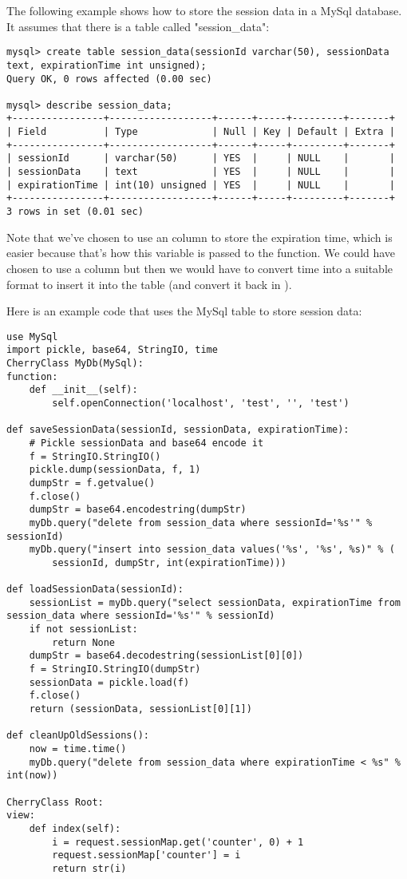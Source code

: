 \documentclass{manual}
\begin{document}
The following example shows how to store the session data in a MySql database. It assumes that there is a table called "session_data":
\begin{verbatim}
mysql> create table session_data(sessionId varchar(50), sessionData text, expirationTime int unsigned);
Query OK, 0 rows affected (0.00 sec)

mysql> describe session_data;
+----------------+------------------+------+-----+---------+-------+
| Field          | Type             | Null | Key | Default | Extra |
+----------------+------------------+------+-----+---------+-------+
| sessionId      | varchar(50)      | YES  |     | NULL    |       |
| sessionData    | text             | YES  |     | NULL    |       |
| expirationTime | int(10) unsigned | YES  |     | NULL    |       |
+----------------+------------------+------+-----+---------+-------+
3 rows in set (0.01 sec)

\end{verbatim}
Note that we've chosen to use an  column to store the expiration time, which is easier because that's how this variable is passed to the  function. We could have chosen to use a  column but then we would have to convert  time into a suitable format to insert it into the table (and convert it back in ).


Here is an example code that uses the  MySql table to store session data:
\begin{verbatim}
use MySql
import pickle, base64, StringIO, time
CherryClass MyDb(MySql):
function:
    def __init__(self):
        self.openConnection('localhost', 'test', '', 'test')

def saveSessionData(sessionId, sessionData, expirationTime):
    # Pickle sessionData and base64 encode it
    f = StringIO.StringIO()
    pickle.dump(sessionData, f, 1)
    dumpStr = f.getvalue()
    f.close()
    dumpStr = base64.encodestring(dumpStr)
    myDb.query("delete from session_data where sessionId='%s'" % sessionId)
    myDb.query("insert into session_data values('%s', '%s', %s)" % (
        sessionId, dumpStr, int(expirationTime)))

def loadSessionData(sessionId):
    sessionList = myDb.query("select sessionData, expirationTime from session_data where sessionId='%s'" % sessionId)
    if not sessionList:
        return None
    dumpStr = base64.decodestring(sessionList[0][0])
    f = StringIO.StringIO(dumpStr)
    sessionData = pickle.load(f)
    f.close()
    return (sessionData, sessionList[0][1])

def cleanUpOldSessions():
    now = time.time()
    myDb.query("delete from session_data where expirationTime < %s" % int(now))

CherryClass Root:
view:
    def index(self):
        i = request.sessionMap.get('counter', 0) + 1
        request.sessionMap['counter'] = i
        return str(i)
\end{verbatim}
\end{document}
